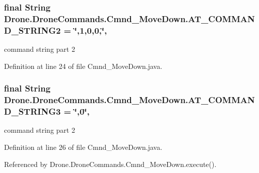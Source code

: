 \subsubsection[{A\+T\+\_\+\+C\+O\+M\+M\+A\+N\+D\+\_\+\+S\+T\+R\+I\+N\+G2}]{\setlength{\rightskip}{0pt plus 5cm}final String Drone.\+Drone\+Commands.\+Cmnd\+\_\+\+Move\+Down.\+A\+T\+\_\+\+C\+O\+M\+M\+A\+N\+D\+\_\+\+S\+T\+R\+I\+N\+G2 = \char`\"{},1,0,0,\char`\"{}\hspace{0.3cm}{\ttfamily [static]}, {\ttfamily [private]}}\label{class_drone_1_1_drone_commands_1_1_cmnd___move_down_aa9c421179171f9753cfd784895d7cc58}
command string part 2 

Definition at line 24 of file Cmnd\+\_\+\+Move\+Down.\+java.

\hypertarget{class_drone_1_1_drone_commands_1_1_cmnd___move_down_af58d9251ce413156da0d8fd53bca1b09}{}
\subsubsection[{A\+T\+\_\+\+C\+O\+M\+M\+A\+N\+D\+\_\+\+S\+T\+R\+I\+N\+G3}]{\setlength{\rightskip}{0pt plus 5cm}final String Drone.\+Drone\+Commands.\+Cmnd\+\_\+\+Move\+Down.\+A\+T\+\_\+\+C\+O\+M\+M\+A\+N\+D\+\_\+\+S\+T\+R\+I\+N\+G3 = \char`\"{},0\char`\"{}\hspace{0.3cm}{\ttfamily [static]}, {\ttfamily [private]}}\label{class_drone_1_1_drone_commands_1_1_cmnd___move_down_af58d9251ce413156da0d8fd53bca1b09}
command string part 2 

Definition at line 26 of file Cmnd\+\_\+\+Move\+Down.\+java.



Referenced by Drone.\+Drone\+Commands.\+Cmnd\+\_\+\+Move\+Down.\+execute().

\hypertarget{class_drone_1_1_drone_commands_1_1_cmnd___move_down_a28208f0d23e215b444a6c4283f884a90}{}
